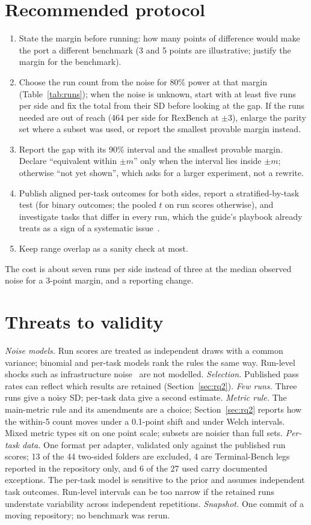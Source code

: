 \documentclass[conference]{IEEEtran}
\begin{document}
\section{Recommended protocol}

\begin{enumerate}
\item State the margin before running: how many points of difference would make the port a different benchmark (3 and 5 points are illustrative; justify the margin for the benchmark).
\item Choose the run count from the noise for 80\% power at that margin (Table~\ref{tab:runs}); when the noise is unknown, start with at least five runs per side and fix the total from their SD before looking at the gap. If the runs needed are out of reach (464 per side for RexBench at $\pm 3$), enlarge the parity set where a subset was used, or report the smallest provable margin instead.
\item Report the gap with its 90\% interval and the smallest provable margin. Declare ``equivalent within $\pm m$'' only when the interval lies inside $\pm m$; otherwise ``not yet shown'', which asks for a larger experiment, not a rewrite.
\item Publish aligned per-task outcomes for both sides, report a stratified-by-task test (for binary outcomes; the pooled $t$ on run scores otherwise), and investigate tasks that differ in every run, which the guide's playbook already treats as a sign of a systematic issue~\cite{harbor_contributing}.
\item Keep range overlap as a sanity check at most.
\end{enumerate}
The cost is about seven runs per side instead of three at the median observed noise for a 3-point margin, and a reporting change.

\section{Threats to validity}

\emph{Noise models.} Run scores are treated as independent draws with a common variance; binomial and per-task models rank the rules the same way. Run-level shocks such as infrastructure noise~\cite{segato_infra_noise} are not modelled. \emph{Selection.} Published pass rates can reflect which results are retained (Section~\ref{sec:rq2}). \emph{Few runs.} Three runs give a noisy SD; per-task data give a second estimate. \emph{Metric rule.} The main-metric rule and its amendments are a choice; Section~\ref{sec:rq2} reports how the within-5 count moves under a 0.1-point shift and under Welch intervals. Mixed metric types sit on one point scale; subsets are noisier than full sets. \emph{Per-task data.} One format per adapter, validated only against the published run scores; 13 of the 44 two-sided folders are excluded, 4 are Terminal-Bench legs reported in the repository only, and 6 of the 27 used carry documented exceptions. The per-task model is sensitive to the prior and assumes independent task outcomes. Run-level intervals can be too narrow if the retained runs understate variability across independent repetitions. \emph{Snapshot.} One commit of a moving repository; no benchmark was rerun.
\end{document}
